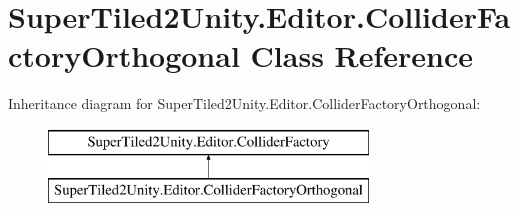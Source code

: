 \hypertarget{class_super_tiled2_unity_1_1_editor_1_1_collider_factory_orthogonal}{}\section{Super\+Tiled2\+Unity.\+Editor.\+Collider\+Factory\+Orthogonal Class Reference}
\label{class_super_tiled2_unity_1_1_editor_1_1_collider_factory_orthogonal}
Inheritance diagram for Super\+Tiled2\+Unity.\+Editor.\+Collider\+Factory\+Orthogonal\+:\begin{figure}[H]
\begin{center}
\leavevmode
\includegraphics[height=2.000000cm]{class_super_tiled2_unity_1_1_editor_1_1_collider_factory_orthogonal}
\end{center}
\end{figure}
